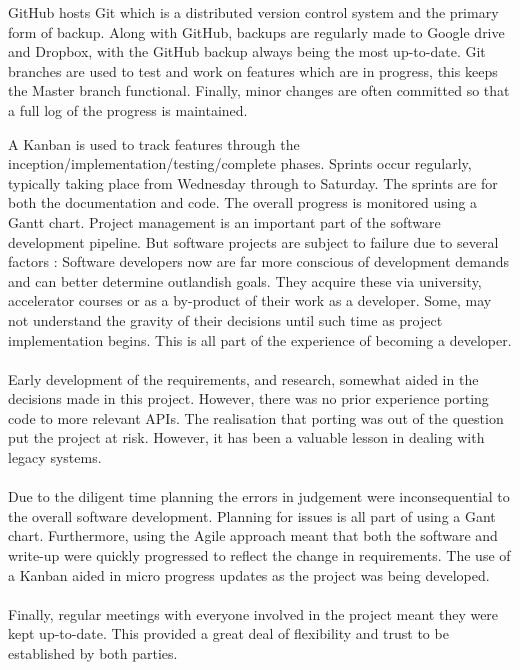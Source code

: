   GitHub hosts Git which is a distributed version control system and the primary form of backup. Along with GitHub, backups are regularly made to Google drive and Dropbox, with the GitHub backup always being the most up-to-date. Git branches are used to test and work on features which are in progress, this keeps the Master branch functional. Finally, minor changes are often committed so that a full log of the progress is maintained.

  A Kanban is used to track features through the inception/implementation/testing/complete phases. Sprints occur regularly, typically taking place from Wednesday through to Saturday. The sprints are for both the documentation and code. The overall progress is monitored using a Gantt chart.
  Project management is an important part of the software development pipeline. But software projects are subject to failure due to several factors \cite{software_failure}:
%
  Software developers now are far more conscious of development demands and can better determine outlandish goals. They acquire these via university, accelerator courses or as a by-product of their work as a developer. Some, may not understand the gravity of their decisions until such time as project implementation begins. This is all part of the experience of becoming a developer.\\\\
  Early development of the requirements, and research, somewhat aided in the decisions made in this project. However, there was no prior experience porting code to more relevant APIs. The realisation that porting was out of the question put the project at risk. However, it has been a valuable lesson in dealing with legacy systems.\\\\
  Due to the diligent time planning the errors in judgement were inconsequential to the overall software development. Planning for issues is all part of using a Gant chart. Furthermore, using the Agile approach meant that both the software and write-up were quickly progressed to reflect the change in requirements. The use of a Kanban aided in micro progress updates as the project was being developed.\\\\
  Finally, regular meetings with everyone involved in the project meant they were kept up-to-date. This provided a great deal of flexibility and trust to be established by both parties.


